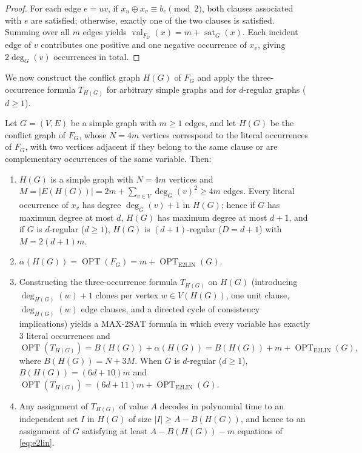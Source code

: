 \documentclass[preprints,article,accept,oneauthor,pdftex]{Definitions/mdpi}
\begin{document}
\begin{proof}
For each edge $e=uv$, if $x_u \oplus x_v \equiv b_e \pmod{2}$, both clauses associated with $e$ are satisfied; otherwise, exactly one of the two clauses is satisfied. Summing over all $m$ edges yields $\operatorname{val}_{F_G}(x) = m + \operatorname{sat}_G(x)$. Each incident edge of $v$ contributes one positive and one negative occurrence of $x_v$, giving $2\deg_G(v)$ occurrences in total.
\end{proof}

We now construct the conflict graph $H(G)$ of $F_G$ and apply the three-occurrence formula $T_{H(G)}$ for arbitrary simple graphs and for $d$-regular graphs ($d \ge 1$).

\begin{Proposition}\label{prop:conflict}
Let $G=(V,E)$ be a simple graph with $m \ge 1$ edges, and let $H(G)$ be the conflict graph of $F_G$, whose $N=4m$ vertices correspond to the literal occurrences of $F_G$, with two vertices adjacent if they belong to the same clause or are complementary occurrences of the same variable. Then:
\begin{enumerate}
\item $H(G)$ is a simple graph with $N=4m$ vertices and $M = |E(H(G))| = 2m + \sum_{v\in V} \deg_G(v)^2 \ge 4m$ edges. Every literal occurrence of $x_v$ has degree $\deg_G(v)+1$ in $H(G)$; hence if $G$ has maximum degree at most $d$, $H(G)$ has maximum degree at most $d+1$, and if $G$ is $d$-regular ($d \ge 1$), $H(G)$ is $(d+1)$-regular ($D = d+1$) with $M = 2(d+1)m$.
\item $\alpha(H(G)) = \operatorname{OPT}(F_G) = m + \operatorname{OPT}_{\mathrm{E2LIN}}(G)$.
\item Constructing the three-occurrence formula $T_{H(G)}$ on $H(G)$ (introducing $\deg_{H(G)}(w)+1$ clones per vertex $w \in V(H(G))$, one unit clause, $\deg_{H(G)}(w)$ edge clauses, and a directed cycle of consistency implications) yields a $\mathrm{MAX\text{-}2SAT}$ formula in which every variable has exactly $3$ literal occurrences and
\[
\operatorname{OPT}(T_{H(G)}) = B(H(G)) + \alpha(H(G)) = B(H(G)) + m + \operatorname{OPT}_{\mathrm{E2LIN}}(G),
\]
where $B(H(G)) = N + 3M$. When $G$ is $d$-regular ($d \ge 1$), $B(H(G)) = (6d+10)m$ and $\operatorname{OPT}(T_{H(G)}) = (6d+11)m + \operatorname{OPT}_{\mathrm{E2LIN}}(G)$.
\item Any assignment of $T_{H(G)}$ of value $A$ decodes in polynomial time to an independent set $I$ in $H(G)$ of size $|I| \ge A - B(H(G))$, and hence to an assignment of $G$ satisfying at least $A - B(H(G)) - m$ equations of \eqref{eq:e2lin}.
\end{enumerate}
\end{Proposition}
\end{document}
